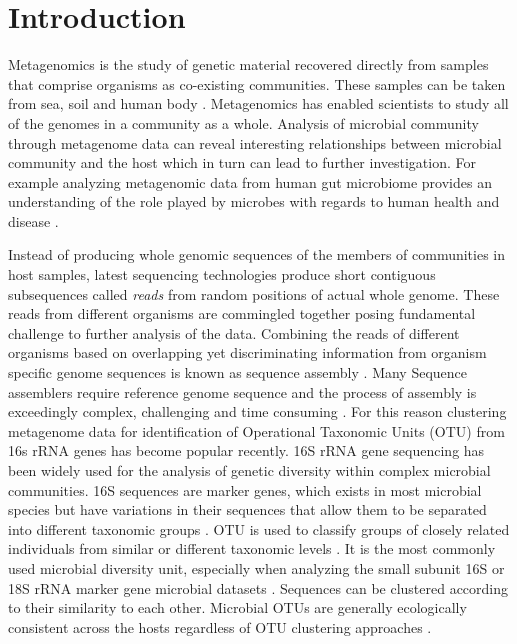 \documentclass[10pt, conference, compsocconf]{IEEEtran}
\begin{document}
\section{Introduction}
\label{intro}
Metagenomics is the study of genetic material recovered directly from samples that comprise organisms as co-existing communities. These samples can be taken from sea, soil and human body \cite{MARSeaMetaGenome}\cite{MARHumanGut}. Metagenomics has enabled scientists to study all of the genomes in a community as a whole. Analysis of microbial community through metagenome data can reveal interesting relationships between microbial community and the host which in turn can lead to further investigation. For example analyzing metagenomic data from human gut microbiome provides an understanding of the role played by microbes with regards to human health and disease \cite{MARHumanMicro}.

Instead of producing whole genomic sequences of the members of communities in host samples, latest sequencing technologies produce short contiguous subsequences called \textit{reads} from random positions of actual whole genome. These reads from different organisms are commingled together posing fundamental challenge to further analysis of the data. Combining the reads of different organisms based on overlapping yet discriminating information from organism specific genome sequences is known as sequence assembly \cite{MARDosphila}. Many Sequence assemblers require reference genome sequence and the process of assembly is exceedingly complex, challenging and time consuming \cite{MARCharuvaka}. For this reason clustering metagenome data for identification of Operational Taxonomic Units (OTU) from 16s rRNA genes has become popular recently. 16S rRNA gene sequencing has been widely used for the analysis of genetic diversity within complex microbial communities. 16S sequences are marker genes, which exists in most microbial species but have variations in their sequences that allow them to be separated into different taxonomic groups \cite{MAR16S}. OTU is used to classify groups of closely related individuals from similar or different taxonomic levels \cite{MAROTU}. It is the most commonly used microbial diversity unit, especially when analyzing the small subunit 16S or 18S rRNA marker gene microbial datasets \cite{MAROTU2}. Sequences can be clustered according to their similarity to each other. Microbial OTUs are generally ecologically consistent across the hosts regardless of OTU clustering approaches \cite{MAROTUConsistant}.
\end{document}
